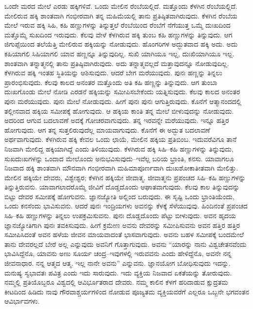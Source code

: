 ಒಂದೇ ಮರದ ಮೇಲೆ ಎರಡು ಹಕ್ಕಿಗಳಿವೆ. ಒಂದು ಮೇಲಿನ ರೆಂಬೆಯಲ್ಲಿದೆ. ಮತ್ತೊಂದು ಕೆಳಗಿನ ರೆಂಬೆಯಲ್ಲಿದೆ. ಮೇಲಿರುವ ಹಕ್ಕಿ ಶಾಂತವಾಗಿ ಗಂಭೀರವಾಗಿ ತನ್ನ ಮಹಿಮೆಯಲ್ಲಿ ತಾನು ಪ್ರತಿಷ್ಠಿತವಾಗಿರುವುದು. ಕೆಳಗಿನ ರೆಂಬೆಯ ಮೇಲೆ ಇರುವ ಹಕ್ಕಿ ಸಿಹಿ, ಕಹಿ ಹಣ್ಣುಗಳನ್ನು ತಿನ್ನುತ್ತಲೆ ರೆಂಬೆಯಿಂದ ರೆಂಬೆಗೆ ನೆಗೆಯುತ್ತ ಒಮ್ಮೆ ದುಃಖದಿಂದ ಮತ್ತೊಮ್ಮೆ ಸುಖದಿಂದ ಇರುವುದು. ಕೆಲವು ವೇಳೆ ಕೆಳಗಿರುವ ಹಕ್ಕಿ ತುಂಬ ಕಹಿ ಹಣ್ಣುಗಳನ್ನು ತಿನ್ನುವುದು. ಆಗ ಜಿಗುಪ್ಸೆಯಿಂದ ತಲೆಯೆತ್ತಿ ಮೇಲಿರುವ ಹಕ್ಕಿಯನ್ನು ನೋಡುವುದು. ಹೊಂಗರಿಗಳ ಅದ್ಭುತವಾದ ಹಕ್ಕಿ ಅದು. ಅದು ಕಹಿಯಾಗಲಿ ಸಿಹಿಯಾಗಲಿ ಯಾವ ಹಣ್ಣನ್ನೂ ತಿನ್ನುವುದಿಲ್ಲ. ಸುಖಿ ಯಾಗಿಯೂ ಇಲ್ಲ, ದುಃಖಿಯಾಗಿಯೂ ಇಲ್ಲ. ಶಾಂತವಾಗಿ ತನ್ನಾತ್ಮನಲ್ಲಿ ತಾನು ಪ್ರತಿಷ್ಠಿವಾಗಿರುವುದು. ಅದು ತನ್ನಾತ್ಮವಲ್ಲದೆ ಮತ್ತಾವುದನ್ನೂ ನೋಡುವುದಿಲ್ಲ. ಕೆಳಗಿರುವ ಹಕ್ಕಿ ಇಂತಹ ಸ್ಥಿತಿಯನ್ನು ಆಶಿಸುವುದು. ಆದರೆ ಬೇಗ ಮರೆಯುವುದು. ಪುನಃ ಹಣ್ಣನ್ನು ತಿನ್ನಲು ಪ್ರಾರಂಭಿಸುವುದು. ಕೆಲವು ಕಾಲದ ಅನಂತರ ಮತ್ತೊಂದು ಅತಿ ಕಹಿ ಹಣ್ಣನ್ನು ತಿನ್ನುವುದು. ಆಗ ತುಂಬಾ ದುಃಖಗೊಂಡು ಮೇಲೆ ನೋಡಿ ಎರಡನೆ ಹಕ್ಕಿಯನ್ನು ಸಮೀಪಿಸಬೇಕೆಂದು ಯತ್ನಿಸುವುದು. ಕೆಲವು ಕಾಲದ ಅನಂತರ ಪುನಃ ಮರೆಯುವುದು. ಪುನಃ ಮೇಲೆ ನೋಡುವುದು. ಹೀಗೆ ಪುನಃ ಪುನಃ ಆಗುತ್ತಿರುವುದು. ಕೊನೆಗೆ ಆತ್ಮಾನಂದದಲ್ಲಿ ತಲ್ಲೀನವಾದ ಹಕ್ಕಿಯ ಸಮೀಪಕ್ಕೆ ಹೋಗುವುದು. ಆ ಹಕ್ಕಿಯ ಕಾಂತಿ ತನ್ನ ಮೇಲೆ ಬೀಳುವುದನ್ನು ನೋಡುವುದು. ಅದರಿಂದ ಆಗುವ ಬದಲಾವಣೆ ಅದಕ್ಕೆ ಗೋಚರವಾಗುವುದು. ತನ್ನ ಇರವನ್ನೇ ಮರೆಯುವುದು. ಇನ್ನೂ ಹತ್ತಿರ ಹೋಗುವುದು. ಆಗ ತನ್ನ ಸುತ್ತಲಿರುವುದೆಲ್ಲ ಮಾಯವಾಗುವುದು. ಕೊನೆಗೆ ಈ ಅದ್ಭುತ ಬದಲಾವಣೆ ಅರ್ಥವಾಗುವುದು. ಕೆಳಗಿರುವ ಹಕ್ಕಿ ಕೇವಲ ಒಂದು ಛಾಯೆ, ಮೇಲಿನ ಹಕ್ಕಿಯ ಪ್ರತಿಬಿಂಬ. ಇದುವರೆವಿಗೂ ತಾನೆ ನಿಜವಾಗಿ ಮೇಲಿದ್ದ ಹಕ್ಕಿಯಾಗಿದ್ದೆ ಎಂದು ತಿಳಿಯುವುದು. ಕೆಳಗಿರುವ ಹಕ್ಕಿ ಸಿಹಿ–ಕಹಿ ಹಣ್ಣುಗಳನ್ನು ತಿನ್ನುವುದು, ಸುಖದುಃಖಗಳನ್ನು ಒಂದಾದ ಮೇಲೊಂದು ಅನುಭವಿಸುವುದು–ಇವೆಲ್ಲ ಬರಿಯ ಭ್ರಾಂತಿ, ಕನಸು. ಯಾವಾಗಲೂ ನಿಜವಾದ ಹಕ್ಕಿ ಶಾಂತವಾಗಿ ಮೌನವಾಗಿ ಗಂಭೀರವಾಗಿ ಮಹಿಮಾಪೂರ್ಣವಾಗಿ ದುಃಖಶೋಕಾತೀತವಾಗಿ ಮೇಲಿತ್ತು. ಮೇಲಿನ ಹಕ್ಕಿಯೇ ದೇವರು, ವಿಶ್ವೇಶ್ವರ; ಕೆಳಗಿನ ಹಕ್ಕಿಯೇ ಜೀವಾತ್ಮ. ಜೀವಾತ್ಮನು ಪ್ರಪಂಚದ ಸಿಹಿ–ಕಹಿ ಹಣ್ಣುಗಳನ್ನು ತಿನ್ನುತ್ತಿರುವನು. ಯಾವಾಗಲಾದರೊಮ್ಮೆ ಜೀವಿಗೆ ದೊಡ್ಡದೊಂದು ಆಘಾತವಾಗುವುದು. ಕೆಲವು ಕಾಲ ತಿನ್ನುವುದನ್ನು ಬಿಟ್ಟು ದೇವರ ಸಮೀಪಕ್ಕೆ ಹೋಗುವನು. ಜ್ಞಾನಜ್ಯೋತಿ ಅಲ್ಲಿಂದ ಬರುವುದು. ಈ ಸೃಷ್ಟಿ ಒಂದು ಭ್ರಾಂತಿಯೆಂದು, ಒಂದು ಕನಸೆಂದು ಭಾವಿಸುವನು. ಆದರೆ ಪುನಃ ಇಂದ್ರಿಯಗಳು ಅವನನ್ನು ಕೆಳಕ್ಕೆ ಸೆಳೆಯುವುವು. ಹಿಂದಿನಂತೆ ಪ್ರಪಂಚದ ಸಿಹಿ–ಕಹಿ ಹಣ್ಣುಗಳನ್ನು ತಿನ್ನಲು ಉಪಕ್ರಮಿಸುವನು. ಪುನಃ ದೊಡ್ಡದೊಂದು ಪೆಟ್ಟು ಬೀಳುವುದು. ಅವನ ಹೃದಯ ಜ್ಞಾನಜ್ಯೋತಿಗಾಗಿ ಪುನಃ ತವಕಿಸುವುದು. ಹೀಗೆ ಕ್ರಮೇಣ ಅವನು ದೇವರನ್ನು ಸಮೀಪಿಸುವನು ಅವನ ಹತ್ತಿರ ಹತ್ತಿರ ಸಮೀಪಿಸಿದಂತೆ ಅವನ ಹಳೆಯ ಜೀವನ ಮಾಯವಾದಂತೆ ಭಾಸವಾಗುವುದು. ಅವನು ಬಹಳ ಸಮೀಪಕ್ಕೆ ಬಂದಮೇಲೆ ತಾನು ದೇವರಲ್ಲದೆ ಬೇರೆ ಅಲ್ಲ ಎನ್ನುವುದು ಅವನಿಗೆ ಗೊತ್ತಾಗುವುದು. ಅವನು “ಯಾರನ್ನು ನಾನು ವಿಶ್ವಚೇತನವೆಂದು ಭಾವಿಸಿದ್ದೆನೊ, ಯಾವನು ಅಣು ಸೂರ್ಯ ಚಂದ್ರ–ಇವುಗಳಲ್ಲಿ ಇರುವವನು ಎಂದು ಹೇಳಿದ್ದೆನೊ, ಅವನೇ ನನ್ನ ಜೀವನಾಧಾರ. ನನ್ನ ಆತ್ಮದ ಆತ್ಮ. ಇಲ್ಲ ನಾನೇ ಅವನು” ಎನ್ನುವನು. ಜ್ಞಾನಯೋಗ ಬೋಧಿಸುವುದು ಇದನ್ನು. ಮನುಷ್ಯ ಸ್ವಭಾವತಃ ಪವಿತ್ರ ಎಂದು ಇದು ಸಾರುವುದು. ಇದು ವ್ಯಕ್ತಿಯ ನಿಜವಾದ ಏಕತೆಯನ್ನು ತೋರುವುದು. ನಮ್ಮಲ್ಲಿ ಪ್ರತಿಯೊಬ್ಬರೂ ವಿಶ್ವದಲ್ಲಿ ಆವಿರ್ಭೂತರಾದ ದೇವರು. ನಮ್ಮ ಕಾಲಿನ ಕೆಳಗೆ ಹರಿದಾಡುವ ಕ್ಷುದ್ರತಮ ಕೀಟದಿಂದ ಹಿಡಿದು ನಾವು ಗೌರವಾಶ್ಚರ್ಯಗಳಿಂದ ನೋಡುವ ಪೂಜ್ಯತಮ ವ್ಯಕ್ತಿಯವರೆಗೆ ಎಲ್ಲರೂ ಒಬ್ಬನೇ ಭಗವಂತನ ಆವಿರ್ಭಾವಗಳು.

